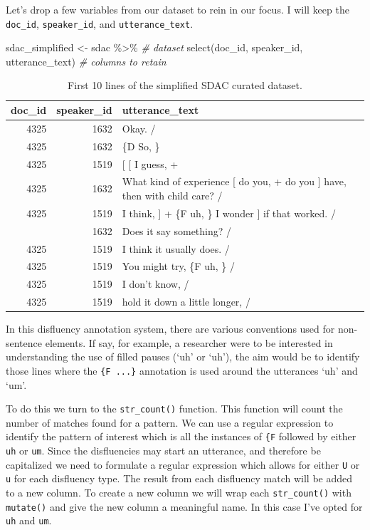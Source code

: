 \documentclass[
]{article}
\newenvironment{Shaded}{\begin{snugshade}}{\end{snugshade}}
\newcommand{\CommentTok}[1]{\textcolor[rgb]{0.56,0.35,0.01}{\textit{#1}}}
\newcommand{\FunctionTok}[1]{\textcolor[rgb]{0.00,0.00,0.00}{#1}}
\newcommand{\NormalTok}[1]{#1}
\newcommand{\OtherTok}[1]{\textcolor[rgb]{0.56,0.35,0.01}{#1}}
\newcommand{\SpecialCharTok}[1]{\textcolor[rgb]{0.00,0.00,0.00}{#1}}
\begin{document}
Let's drop a few variables from our dataset to rein in our focus. I will keep the \texttt{doc\_id}, \texttt{speaker\_id}, and \texttt{utterance\_text}.

\begin{Shaded}
\begin{Highlighting}[]
\NormalTok{sdac\_simplified }\OtherTok{\textless{}{-}} 
\NormalTok{  sdac }\SpecialCharTok{\%\textgreater{}\%} \CommentTok{\# dataset}
  \FunctionTok{select}\NormalTok{(doc\_id, speaker\_id, utterance\_text) }\CommentTok{\# columns to retain}
\end{Highlighting}
\end{Shaded}

\begin{table}

\caption{\label{tab:td-sdac-simple-preview}First 10 lines of the simplified SDAC curated dataset.}
\centering
\begin{tabular}[t]{rrl}
\toprule
doc\_id & speaker\_id & utterance\_text\\
\midrule
4325 & 1632 & Okay.  /\\
4325 & 1632 & \{D So, \}\\
4325 & 1519 & {}[ [ I guess, +\\
4325 & 1632 & What kind of experience [ do you, + do you ] have, then with child care? /\\
4325 & 1519 & I think, ] + \{F uh, \} I wonder ] if that worked. /\\
\addlinespace
4325 & 1632 & Does it say something? /\\
4325 & 1519 & I think it usually does.  /\\
4325 & 1519 & You might try, \{F uh, \}  /\\
4325 & 1519 & I don't know,  /\\
4325 & 1519 & hold it down a little longer,  /\\
\bottomrule
\end{tabular}
\end{table}

In this disfluency annotation system, there are various conventions used for non-sentence elements. If say, for example, a researcher were to be interested in understanding the use of filled pauses (`uh' or `uh'), the aim would be to identify those lines where the \texttt{\{F\ ...\}} annotation is used around the utterances `uh' and `um'.

To do this we turn to the \texttt{str\_count()} function. This function will count the number of matches found for a pattern. We can use a regular expression to identify the pattern of interest which is all the instances of \texttt{\{F} followed by either \texttt{uh} or \texttt{um}. Since the disfluencies may start an utterance, and therefore be capitalized we need to formulate a regular expression which allows for either \texttt{U} or \texttt{u} for each disfluency type. The result from each disfluency match will be added to a new column. To create a new column we will wrap each \texttt{str\_count()} with \texttt{mutate()} and give the new column a meaningful name. In this case I've opted for \texttt{uh} and \texttt{um}.
\end{document}
